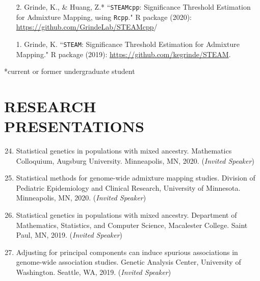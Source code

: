 \documentclass[margin]{res}
\newenvironment{benumerate}[1]{
    \let\oldItem\item
    \def\item{\addtocounter{enumi}{-2}\oldItem}
    
    \begin{enumerate}
    \setcounter{enumi}{#1}
    \addtocounter{enumi}{1}
}{
    \end{enumerate}
}
\begin{document}
\begin{resume}
\begin{itemize}
\item[2.] Grinde, K., \& Huang, Z.* ``\texttt{STEAMcpp}: Significance Threshold Estimation for Admixture Mapping, using \texttt{Rcpp}." R package (2020): \href{https://github.com/GrindeLab/STEAMcpp}{https://github.com/GrindeLab/STEAMcpp}/
\item[1.] Grinde, K. ``\texttt{STEAM}: Significance Threshold Estimation for Admixture Mapping." R package (2019): \href{https://github.com/kegrinde/STEAM}{https://github.com/kegrinde/STEAM}.
\end{itemize}
					
*current or former undergraduate student

\section{RESEARCH \\ PRESENTATIONS}

\begin{benumerate}{23} %
\item Statistical genetics in populations with mixed ancestry. Mathematics Colloquium, Augsburg University. Minneapolis, MN, 2020. (\textit{Invited Speaker})

\item Statistical methods for genome-wide admixture mapping studies. Division of Pediatric Epidemiology and Clinical Research, University of Minnesota. Minneapolis, MN, 2020. (\textit{Invited Speaker})

\item Statistical genetics in populations with mixed ancestry. Department of Mathematics, Statistics, and Computer Science, Macalester College. Saint Paul, MN, 2019. (\textit{Invited Speaker})


\item Adjusting for principal components can induce spurious associations in genome-wide association studies. Genetic Analysis Center, University of Washington. Seattle, WA, 2019. (\textit{Invited Speaker})


\end{benumerate}
\end{resume}
\end{document}
